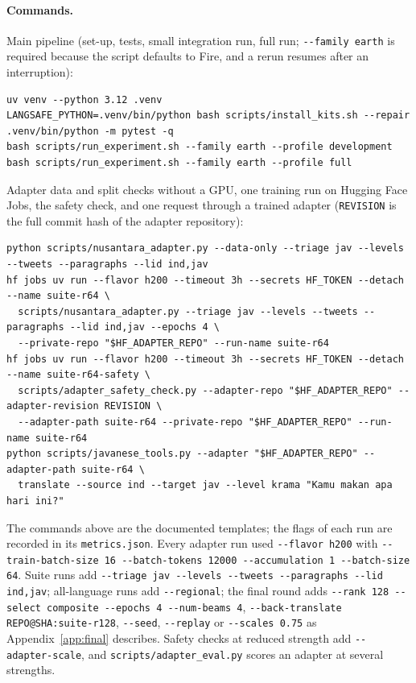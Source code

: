 \documentclass[11pt]{article}
\begin{document}
\paragraph{Commands.} Main pipeline (set-up, tests, small integration run, full run; \texttt{-{}-family earth} is
required because the script defaults to Fire, and a rerun resumes after an interruption):
\begin{lstlisting}
uv venv --python 3.12 .venv
LANGSAFE_PYTHON=.venv/bin/python bash scripts/install_kits.sh --repair
.venv/bin/python -m pytest -q
bash scripts/run_experiment.sh --family earth --profile development
bash scripts/run_experiment.sh --family earth --profile full
\end{lstlisting}
Adapter data and split checks without a GPU, one training run on Hugging Face Jobs, the safety check, and one
request through a trained adapter (\texttt{REVISION} is the full commit hash of the adapter repository):
\begin{lstlisting}
python scripts/nusantara_adapter.py --data-only --triage jav --levels --tweets --paragraphs --lid ind,jav
hf jobs uv run --flavor h200 --timeout 3h --secrets HF_TOKEN --detach --name suite-r64 \
  scripts/nusantara_adapter.py --triage jav --levels --tweets --paragraphs --lid ind,jav --epochs 4 \
  --private-repo "$HF_ADAPTER_REPO" --run-name suite-r64
hf jobs uv run --flavor h200 --timeout 3h --secrets HF_TOKEN --detach --name suite-r64-safety \
  scripts/adapter_safety_check.py --adapter-repo "$HF_ADAPTER_REPO" --adapter-revision REVISION \
  --adapter-path suite-r64 --private-repo "$HF_ADAPTER_REPO" --run-name suite-r64
python scripts/javanese_tools.py --adapter "$HF_ADAPTER_REPO" --adapter-path suite-r64 \
  translate --source ind --target jav --level krama "Kamu makan apa hari ini?"
\end{lstlisting}
{\raggedright The commands above are the documented templates; the flags of each run are recorded in its \texttt{metrics.json}.
Every adapter run used \texttt{-{}-flavor h200} with \texttt{-{}-train-batch-size 16 -{}-batch-tokens 12000
-{}-accumulation 1 -{}-batch-size 64}. Suite runs add \texttt{-{}-triage jav -{}-levels -{}-tweets -{}-paragraphs -{}-lid
ind,jav}; all-language runs add \texttt{-{}-regional}; the final round adds \texttt{-{}-rank 128 -{}-select composite
-{}-epochs 4 -{}-num-beams 4}, \texttt{-{}-back-translate REPO@SHA:suite-r128}, \texttt{-{}-seed}, \texttt{-{}-replay} or
\texttt{-{}-scales 0.75} as Appendix~\ref{app:final} describes. Safety checks at reduced strength add
\texttt{-{}-adapter-scale}, and \texttt{scripts/adapter\_eval.py} scores an adapter at several strengths.\par}
\end{document}
